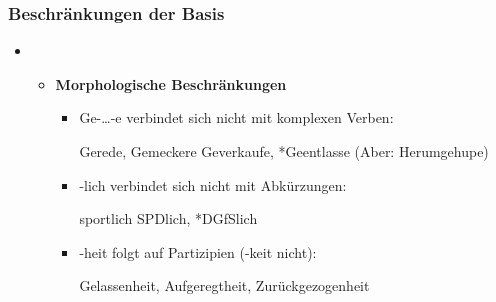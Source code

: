 \begin{frame}
\frametitle{Beschränkungen der Basis}

\begin{itemize}
	\item[]

	\begin{itemize}
		\item \textbf{Morphologische Beschränkungen}
	
		\begin{itemize}
			\item Ge-{\dots}-e verbindet sich nicht mit komplexen Verben:
		
			\ea Gerede, Gemeckere \vs *Geverkaufe, *Geentlasse (Aber: Herumgehupe)
			\z
			
			\item -lich verbindet sich nicht mit Abkürzungen:
		
			\ea sportlich \vs *SPDlich, *DGfSlich
			\z
			
			\item -heit folgt auf Partizipien (-keit nicht):
		 
			\ea Gelassenheit, Aufgeregtheit, Zurückgezogenheit
		 	\z
		 	
		\end{itemize}
	
	\end{itemize}

\end{itemize}

\end{frame}




